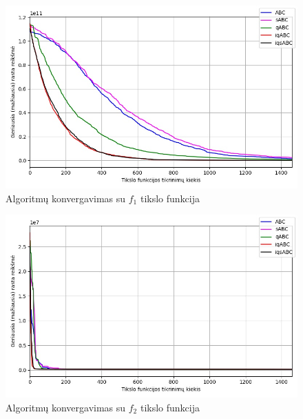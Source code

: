 \documentclass{VUMIFPSmagistrinis}
\begin{document}
\begin{landscape}
\begin{multicols}{2}
\begin{figure}[H]
    \centering
    \includegraphics[scale=0.45]{img/2kv/all_f1.jpg}
    \caption{Algoritmų konvergavimas su $f_{1}$ tikslo funkcija}
    \label{img:konf1}
\end{figure}

\begin{figure}[H]
    \centering
    \includegraphics[scale=0.45]{img/2kv/all_f2.jpg}
    \caption{Algoritmų konvergavimas su $f_{2}$ tikslo funkcija}
    \label{img:konf2}
\end{figure}





\end{multicols}\newpage
\begin{multicols}{2}


\end{multicols}
\end{landscape}
\end{document}
